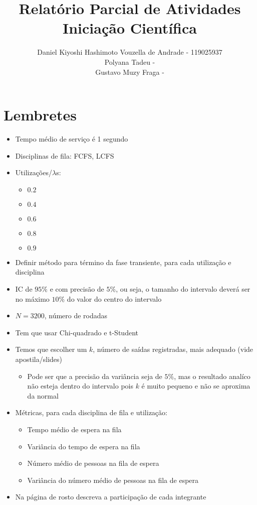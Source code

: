 \documentclass[a4paper]{article}
\title{Relatório Parcial de Atividades\\
  Iniciação Científica}
\author{Daniel Kiyoshi Hashimoto Vouzella de Andrade - 119025937
  \\
Polyana Tadeu -
  \\
Gustavo Muzy Fraga -
}
\date{}
\begin{document}
\maketitle

\section*{Lembretes}
\begin{itemize}
    \item Tempo médio de serviço é 1 segundo
    \item Disciplinas de fila: FCFS, LCFS
    \item Utilizações/\(\lambda\)s:
    \begin{itemize}
        \item \(0.2\)
        \item \(0.4\)
        \item \(0.6\)
        \item \(0.8\)
        \item \(0.9\)
    \end{itemize}
    \item Definir método para término da fase transiente,
        para cada utilização e disciplina
    \item IC de \(95\%\) e com precisão de \(5\%\),
        ou seja, o tamanho do intervalo deverá ser no máximo
        \(10\%\) do valor do centro do intervalo
    \item \(N = 3200\), número de rodadas
    \item Tem que usar Chi-quadrado e t-Student
    \item Temos que escolher um \(k\), número de saídas registradas,
        mais adequado (vide apostila/slides)
    \begin{itemize}
        \item Pode ser que a precisão da variância
            seja de \(5\%\),
            mas o resultado analíco não esteja dentro do intervalo
            pois \(k\) é muito pequeno e não se aproxima da normal
    \end{itemize}
    \item Métricas, para cada disciplina de fila e utilização:
    \begin{itemize}
        \item Tempo médio de espera na fila
        \item Variância do tempo de espera na fila
        \item Número médio de pessoas na fila de espera
        \item Variância do número médio de pessoas na fila de espera
    \end{itemize}
    \item Na página de rosto descreva
        a participação de cada integrante
\end{itemize}
\end{document}
